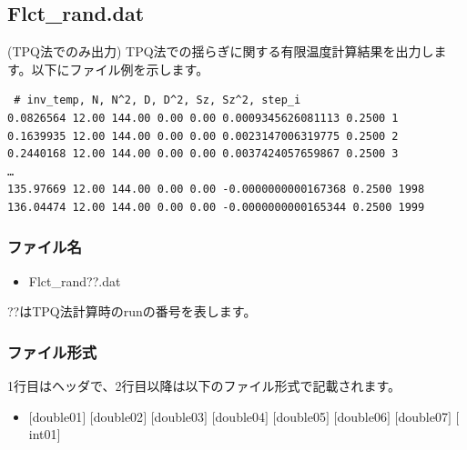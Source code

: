 \newpage
\subsection{Flct\_rand.dat}
\label{Subsec:flctrand}
(TPQ法でのみ出力) TPQ法での揺らぎに関する有限温度計算結果を出力します。以下にファイル例を示します。\\
\begin{minipage}{15cm}
\begin{screen}
\begin{verbatim}
 # inv_temp, N, N^2, D, D^2, Sz, Sz^2, step_i
0.0826564 12.00 144.00 0.00 0.00 0.0009345626081113 0.2500 1
0.1639935 12.00 144.00 0.00 0.00 0.0023147006319775 0.2500 2
0.2440168 12.00 144.00 0.00 0.00 0.0037424057659867 0.2500 3
…
135.97669 12.00 144.00 0.00 0.00 -0.0000000000167368 0.2500 1998
136.04474 12.00 144.00 0.00 0.00 -0.0000000000165344 0.2500 1999
\end{verbatim}
\end{screen}
\end{minipage}

\subsubsection{ファイル名}
 \begin{itemize}
   \item Flct\_rand??.dat
  \end{itemize}
  ??はTPQ法計算時のrunの番号を表します。

\subsubsection{ファイル形式}
1行目はヘッダで、2行目以降は以下のファイル形式で記載されます。
 \begin{itemize}
   \item $[$double01$]$ $[$double02$]$ $[$double03$]$ $[$double04$]$ $[$double05$]$ $[$double06$]$ $[$double07$]$ $[$int01$]$
  \end{itemize}
